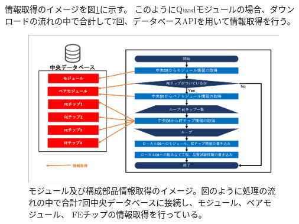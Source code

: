 情報取得のイメージを図\ref{download_process_image}に示す。
このようにQuadモジュールの場合、ダウンロードの流れの中で合計して7回、データベースAPIを用いて情報取得を行う。
\begin{figure}[bpt]\centering
\includegraphics[width=15cm]{./download_process_image.png}
\caption[モジュール及び構成部品情報取得のイメージ図]{モジュール及び構成部品情報取得のイメージ。図のように処理の流れの中で合計7回中央データベースに接続し、モジュール、ベアモジュール、 FEチップの情報取得を行っている。}
\label{download_process_image}
\end{figure}


